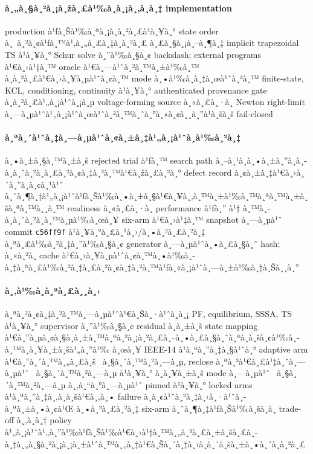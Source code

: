 ﻿\documentclass[12pt,a4paper]{article}
\begin{document}
\paragraph{à¸„à¸§à¸²à¸¡à¸žà¸£à¹‰à¸­à¸¡à¸‚à¸­à¸‡ implementation}
production à¹ƒà¸Šà¹‰à¸ªà¸¡à¸à¸²à¸£à¹à¸¥à¸° state order à¸ à¸²à¸¢à¹ƒà¸™à¹‚à¸„à¸£à¸‡à¸à¸²à¸£ à¸£à¸§à¸¡à¸–à¸¶à¸‡ implicit trapezoidal
TS à¹à¸¥à¸° Schur solve à¸”à¹‰à¸§à¸¢ backslash; external programs à¹€à¸›à¹‡à¸™ oracle à¹€à¸—à¹ˆà¸²à¸™à¸±à¹‰à¸™
à¸à¸²à¸£à¹€à¸›à¸¥à¸µà¹ˆà¸¢à¸™ mode à¸•à¹‰à¸­à¸‡à¸œà¹ˆà¸²à¸™ finite-state, KCL, conditioning, continuity à¹à¸¥à¸°
authenticated provenance gate à¸à¸²à¸£à¹„à¸¡à¹ˆà¸¡à¸µ voltage-forming source à¸«à¸£à¸·à¸­ Newton
right-limit à¸—à¸µà¹ˆà¹„à¸¡à¹ˆà¸œà¹ˆà¸²à¸™à¸ˆà¸°à¸«à¸¢à¸¸à¸”à¹à¸šà¸š fail-closed

\paragraph{à¸ªà¸´à¹ˆà¸‡à¸—à¸µà¹ˆà¸¢à¸±à¸‡à¹„à¸¡à¹ˆà¸­à¹‰à¸²à¸‡}
à¸•à¸±à¸§à¸™à¸±à¸š rejected trial à¹ƒà¸™ search path à¸–à¸¹à¸à¸•à¸±à¸”à¸­à¸­à¸à¸ˆà¸²à¸à¸£à¸²à¸¢à¸‡à¸²à¸™à¹€à¸žà¸£à¸²à¸° defect record
à¸¢à¸±à¸‡à¹€à¸›à¸´à¸”à¸­à¸¢à¸¹à¹ˆ à¸ˆà¸¶à¸‡à¹„à¸¡à¹ˆà¹ƒà¸Šà¹‰à¸•à¸±à¸§à¹€à¸¥à¸‚à¸™à¸±à¹‰à¸™à¸ªà¸™à¸±à¸šà¸ªà¸™à¸¸à¸™ readiness à¸«à¸£à¸·à¸­ performance à¹ƒà¸” à¹†
à¸™à¸­à¸à¸ˆà¸²à¸à¸™à¸µà¹‰à¸œà¸¥ six-arm à¹€à¸›à¹‡à¸™ snapshot à¸—à¸µà¹ˆ commit \texttt{c56ff9f} à¹à¸¥à¸°à¸£à¸¹à¸›/à¸•à¸²à¸£à¸²à¸‡
à¸ªà¸£à¹‰à¸²à¸‡à¸”à¹‰à¸§à¸¢ generator à¸—à¸µà¹ˆà¸•à¸£à¸§à¸ˆ hash; à¸«à¸²à¸ cache à¹€à¸›à¸¥à¸µà¹ˆà¸¢à¸™à¸•à¹‰à¸­à¸‡à¸ªà¸£à¹‰à¸²à¸‡à¸£à¸²à¸¢à¸‡à¸²à¸™à¹ƒà¸«à¸¡à¹ˆà¸—à¸±à¹‰à¸‡à¸Šà¸¸à¸”

\paragraph{à¸‚à¹‰à¸­à¸ªà¸£à¸¸à¸›}
à¸ªà¸²à¸¢à¸‡à¸²à¸™à¸—à¸µà¹ˆà¹€à¸Šà¸·à¹ˆà¸­à¸¡ PF, equilibrium, SSSA, TS à¹à¸¥à¸° supervisor à¸”à¹‰à¸§à¸¢ residual à¸à¸±à¸š
state mapping à¹€à¸”à¸µà¸¢à¸§à¸à¸±à¸™à¸ªà¸²à¸¡à¸²à¸£à¸–à¸•à¸£à¸§à¸ˆà¸ªà¸­à¸šà¸¢à¹‰à¸­à¸™à¸à¸¥à¸±à¸šà¹„à¸”à¹‰ à¸œà¸¥ IEEE-14 à¹à¸ªà¸”à¸‡à¸§à¹ˆà¸² adaptive
arm à¹€à¸”à¸´à¸™à¸„à¸£à¸š \NewRunEnd\ à¸§à¸´à¸™à¸²à¸—à¸µ, reclose à¸ªà¸³à¹€à¸£à¹‡à¸ˆà¸—à¸µà¹ˆ \NewRunReclose\ à¸§à¸´à¸™à¸²à¸—à¸µ à¹à¸¥à¸°
à¸à¸¥à¸±à¸š mode à¸—à¸µà¹ˆ \NewRunModeReselectionTime\ à¸§à¸´à¸™à¸²à¸—à¸µ à¸‚à¸“à¸°à¸—à¸µà¹ˆ pinned à¹à¸¥à¸° locked
arms à¹à¸ªà¸”à¸‡à¸‚à¸­à¸šà¹€à¸‚à¸• failure à¸­à¸¢à¹ˆà¸²à¸‡à¸‹à¸·à¹ˆà¸­à¸ªà¸±à¸•à¸¢à¹Œ à¸•à¸²à¸£à¸²à¸‡ six-arm à¸ˆà¸¶à¸‡à¹ƒà¸Šà¹‰à¸šà¸­à¸ trade-off
à¸‚à¸­à¸‡ policy à¹„à¸¡à¹ˆà¹„à¸”à¹‰à¹ƒà¸Šà¹‰à¹€à¸›à¹‡à¸™à¸„à¸³à¸£à¸±à¸šà¸£à¸­à¸‡à¸„à¸§à¸²à¸¡à¸¡à¸±à¹ˆà¸™à¸„à¸‡à¹€à¸Šà¸´à¸‡à¸›à¸à¸´à¸šà¸±à¸•à¸´à¸à¸²à¸£
\end{document}
